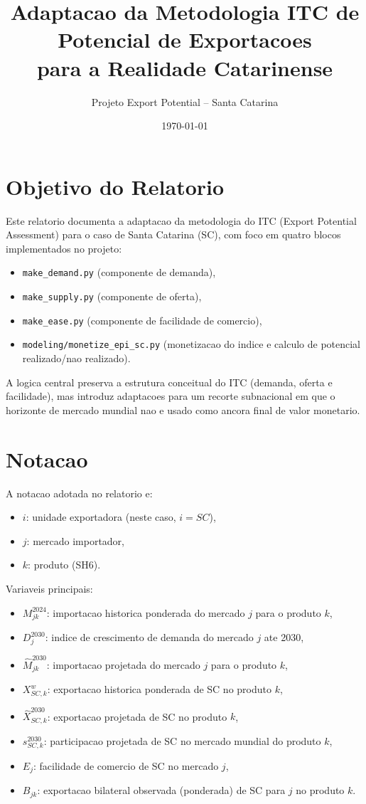 \documentclass[12pt,a4paper]{article}
\title{Adaptacao da Metodologia ITC de Potencial de Exportacoes\\para a Realidade Catarinense}
\author{Projeto Export Potential -- Santa Catarina}
\date{\today}
\begin{document}
\maketitle

\section{Objetivo do Relatorio}
Este relatorio documenta a adaptacao da metodologia do ITC (Export Potential Assessment) para o caso de Santa Catarina (SC), com foco em quatro blocos implementados no projeto:
\begin{itemize}
    \item \texttt{make\_demand.py} (componente de demanda),
    \item \texttt{make\_supply.py} (componente de oferta),
    \item \texttt{make\_ease.py} (componente de facilidade de comercio),
    \item \texttt{modeling/monetize\_epi\_sc.py} (monetizacao do indice e calculo de potencial realizado/nao realizado).
\end{itemize}

A logica central preserva a estrutura conceitual do ITC (demanda, oferta e facilidade), mas introduz adaptacoes para um recorte subnacional em que o horizonte de mercado mundial nao e usado como ancora final de valor monetario.

\section{Notacao}
A notacao adotada no relatorio e:
\begin{itemize}
    \item $i$: unidade exportadora (neste caso, $i=SC$),
    \item $j$: mercado importador,
    \item $k$: produto (SH6).
\end{itemize}

Variaveis principais:
\begin{itemize}
    \item $M_{jk}^{2024}$: importacao historica ponderada do mercado $j$ para o produto $k$,
    \item $D_j^{2030}$: indice de crescimento de demanda do mercado $j$ ate 2030,
    \item $\widehat{M}_{jk}^{2030}$: importacao projetada do mercado $j$ para o produto $k$,
    \item $X_{SC,k}^{w}$: exportacao historica ponderada de SC no produto $k$,
    \item $\widehat{X}_{SC,k}^{2030}$: exportacao projetada de SC no produto $k$,
    \item $s_{SC,k}^{2030}$: participacao projetada de SC no mercado mundial do produto $k$,
    \item $E_j$: facilidade de comercio de SC no mercado $j$,
    \item $B_{jk}$: exportacao bilateral observada (ponderada) de SC para $j$ no produto $k$.
\end{itemize}
\end{document}
